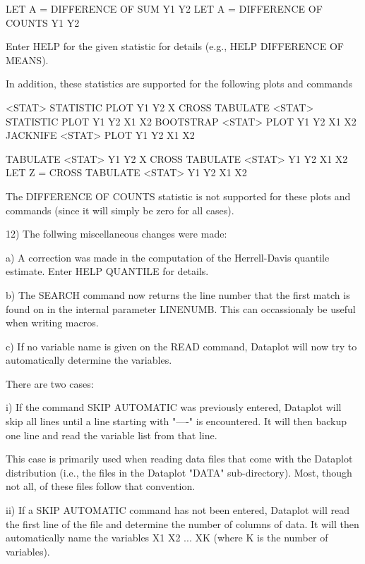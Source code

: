 {        LET A = DIFFERENCE OF SUM Y1 Y2
        LET A = DIFFERENCE OF COUNTS Y1 Y2

    Enter HELP for the given statistic for details (e.g.,
    HELP DIFFERENCE OF MEANS).

    In addition, these statistics are supported for the following
    plots and commands

       <STAT> STATISTIC PLOT Y1 Y2 X
       CROSS TABULATE <STAT> STATISTIC PLOT Y1 Y2 X1 X2
       BOOTSTRAP <STAT> PLOT Y1 Y2 X1 X2
       JACKNIFE <STAT> PLOT Y1 Y2 X1 X2

       TABULATE <STAT> Y1 Y2 X
       CROSS TABULATE <STAT> Y1 Y2 X1 X2
       LET Z = CROSS TABULATE <STAT> Y1 Y2 X1 X2

    The DIFFERENCE OF COUNTS statistic is not supported for these
    plots and commands (since it will simply be zero for all
    cases).

12) The follwing miscellaneous changes were made:

    a) A correction was made in the computation of the Herrell-Davis
       quantile estimate.  Enter HELP QUANTILE for details.

    b) The SEARCH command now returns the line number that the
       first match is found on in the internal parameter
       LINENUMB.  This can occassionaly be useful when writing
       macros.

    c) If no variable name is given on the READ command, Dataplot
       will now try to automatically determine the variables.

       There are two cases:

        i) If the command SKIP AUTOMATIC was previously entered,
           Dataplot will skip all lines until a line starting
           with "----" is encountered.  It will then backup one
           line and read the variable list from that line.

           This case is primarily used when reading data files
           that come with the Dataplot distribution (i.e., the
           files in the Dataplot "DATA" sub-directory).  Most,
           though not all, of these files follow that convention.

       ii) If a SKIP AUTOMATIC command has not been entered,
           Dataplot will read the first line of the file and
           determine the number of columns of data.  It will then
           automatically name the variables X1 X2 ... XK (where
           K is the number of variables).

}
